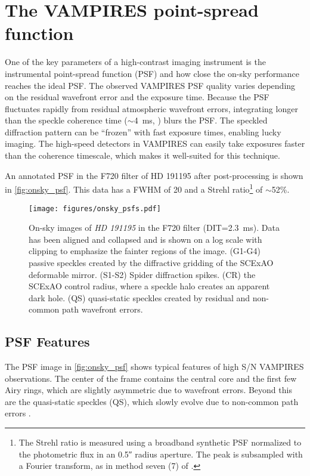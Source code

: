 \section{The VAMPIRES point-spread function}\label{sec:psf}

One of the key parameters of a high-contrast imaging instrument is the instrumental point-spread function (PSF) and how close the on-sky performance reaches the ideal PSF. The observed VAMPIRES PSF quality varies depending on the residual wavefront error and the exposure time. Because the PSF fluctuates rapidly from residual atmospheric wavefront errors, integrating longer than the speckle coherence time ($\sim$\SI{4}{\milli\second}, \citealp{kooten_climate_2022}) blurs the PSF. The speckled diffraction pattern can be ``frozen'' with fast exposure times, enabling lucky imaging. The high-speed detectors in VAMPIRES can easily take exposures faster than the coherence timescale, which makes it well-suited for this technique.


An annotated PSF in the F720 filter of HD 191195 after post-processing is shown in \autoref{fig:onsky_psf}. This data has a FWHM of \SI{20}{\mas} and a Strehl ratio\footnote{The Strehl ratio is measured using a broadband synthetic PSF normalized to the photometric flux in an \ang{;;0.5} radius aperture. The peak is subsampled with a Fourier transform, as in method seven (7) of \citet{roberts_is_2004}.} of $\sim$52\%.

\begin{figure}
    \centering
    \texttt{[image: figures/onsky\_psfs.pdf]}
    \caption{On-sky images of \textit{HD 191195} in the F720 filter (DIT=\SI{2.3}{\milli\second}). Data has been aligned and collapsed and is shown on a log scale with clipping to emphasize the fainter regions of the image. (G1-G4) passive speckles created by the diffractive gridding of the SCExAO deformable mirror. (S1-S2) Spider diffraction spikes. (CR) the SCExAO control radius, where a speckle halo creates an apparent dark hole. (QS) quasi-static speckles created by residual and non-common path wavefront errors.\label{fig:onsky_psf}}
\end{figure}

\subsection{PSF Features}
The PSF image in \autoref{fig:onsky_psf} shows typical features of high S/N VAMPIRES observations. The center of the frame contains the central core and the first few Airy rings, which are slightly asymmetric due to wavefront errors. Beyond this are the quasi-static speckles (QS), which slowly evolve due to non-common path errors \citep{soummer_speckle_2007,ndiaye_calibration_2013}.

